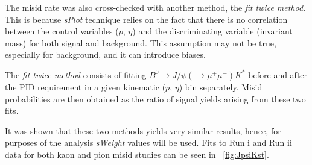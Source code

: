 \color{black}

The misid rate was also cross-checked with another method, the \textit{fit twice method}. This is because \textit{sPlot} technique relies on the fact that there is no correlation between the control variables ($p$, $\eta$) and the discriminating variable (invariant mass) for both signal and background. This assumption may not be true, especially for background, and it can introduce biases.

The \textit{fit twice method} consists of fitting $B^{0} \rightarrow J/\psi(\rightarrow \mu^{+} \mu^{-}) K^{*}$ before and after the \gls{PID} requirement in a given kinematic ($p$, $\eta$) bin separately. Misid probabilities are then obtained as the ratio of signal yields arising from these two fits.


It was shown that these two methods yields very similar results, hence,
for purposes of the \Bmumumu analysis \textit{sWeight} values will be used. Fits to Run \Rn{1} and Run \Rn{2} data for both kaon and pion misid studies can be seen in ~\autoref{fig:JpsiKst}.
